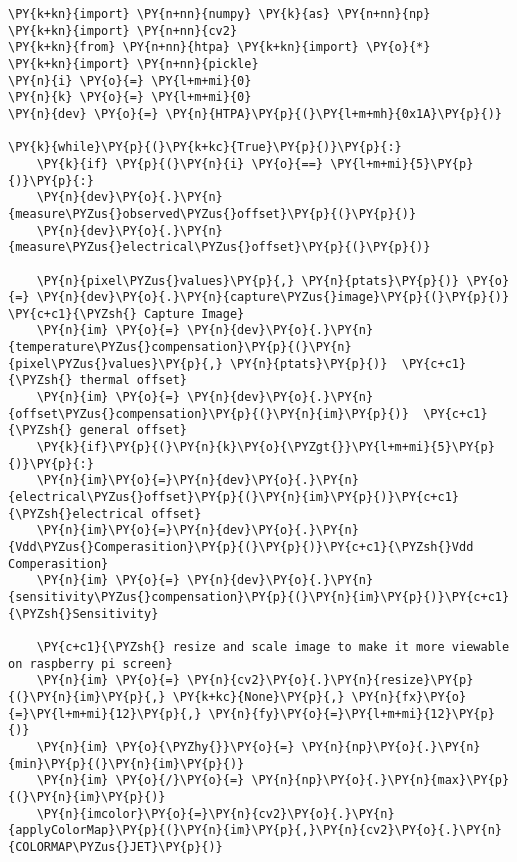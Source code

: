     \begin{tcolorbox}[breakable, size=fbox, boxrule=1pt, pad at break*=1mm,colback=cellbackground, colframe=cellborder]
\begin{Verbatim}[commandchars=\\\{\}]
\PY{k+kn}{import} \PY{n+nn}{numpy} \PY{k}{as} \PY{n+nn}{np}
\PY{k+kn}{import} \PY{n+nn}{cv2}
\PY{k+kn}{from} \PY{n+nn}{htpa} \PY{k+kn}{import} \PY{o}{*}
\PY{k+kn}{import} \PY{n+nn}{pickle}
\PY{n}{i} \PY{o}{=} \PY{l+m+mi}{0}
\PY{n}{k} \PY{o}{=} \PY{l+m+mi}{0}
\PY{n}{dev} \PY{o}{=} \PY{n}{HTPA}\PY{p}{(}\PY{l+m+mh}{0x1A}\PY{p}{)}

\PY{k}{while}\PY{p}{(}\PY{k+kc}{True}\PY{p}{)}\PY{p}{:}
    \PY{k}{if} \PY{p}{(}\PY{n}{i} \PY{o}{==} \PY{l+m+mi}{5}\PY{p}{)}\PY{p}{:}
    \PY{n}{dev}\PY{o}{.}\PY{n}{measure\PYZus{}observed\PYZus{}offset}\PY{p}{(}\PY{p}{)}
    \PY{n}{dev}\PY{o}{.}\PY{n}{measure\PYZus{}electrical\PYZus{}offset}\PY{p}{(}\PY{p}{)}

    \PY{n}{pixel\PYZus{}values}\PY{p}{,} \PY{n}{ptats}\PY{p}{)} \PY{o}{=} \PY{n}{dev}\PY{o}{.}\PY{n}{capture\PYZus{}image}\PY{p}{(}\PY{p}{)}  \PY{c+c1}{\PYZsh{} Capture Image}
    \PY{n}{im} \PY{o}{=} \PY{n}{dev}\PY{o}{.}\PY{n}{temperature\PYZus{}compensation}\PY{p}{(}\PY{n}{pixel\PYZus{}values}\PY{p}{,} \PY{n}{ptats}\PY{p}{)}  \PY{c+c1}{\PYZsh{} thermal offset}
    \PY{n}{im} \PY{o}{=} \PY{n}{dev}\PY{o}{.}\PY{n}{offset\PYZus{}compensation}\PY{p}{(}\PY{n}{im}\PY{p}{)}  \PY{c+c1}{\PYZsh{} general offset}
    \PY{k}{if}\PY{p}{(}\PY{n}{k}\PY{o}{\PYZgt{}}\PY{l+m+mi}{5}\PY{p}{)}\PY{p}{:}
    \PY{n}{im}\PY{o}{=}\PY{n}{dev}\PY{o}{.}\PY{n}{electrical\PYZus{}offset}\PY{p}{(}\PY{n}{im}\PY{p}{)}\PY{c+c1}{\PYZsh{}electrical offset}
    \PY{n}{im}\PY{o}{=}\PY{n}{dev}\PY{o}{.}\PY{n}{Vdd\PYZus{}Comperasition}\PY{p}{(}\PY{p}{)}\PY{c+c1}{\PYZsh{}Vdd Comperasition}
    \PY{n}{im} \PY{o}{=} \PY{n}{dev}\PY{o}{.}\PY{n}{sensitivity\PYZus{}compensation}\PY{p}{(}\PY{n}{im}\PY{p}{)}\PY{c+c1}{\PYZsh{}Sensitivity}

    \PY{c+c1}{\PYZsh{} resize and scale image to make it more viewable on raspberry pi screen}
    \PY{n}{im} \PY{o}{=} \PY{n}{cv2}\PY{o}{.}\PY{n}{resize}\PY{p}{(}\PY{n}{im}\PY{p}{,} \PY{k+kc}{None}\PY{p}{,} \PY{n}{fx}\PY{o}{=}\PY{l+m+mi}{12}\PY{p}{,} \PY{n}{fy}\PY{o}{=}\PY{l+m+mi}{12}\PY{p}{)}	
    \PY{n}{im} \PY{o}{\PYZhy{}}\PY{o}{=} \PY{n}{np}\PY{o}{.}\PY{n}{min}\PY{p}{(}\PY{n}{im}\PY{p}{)}
    \PY{n}{im} \PY{o}{/}\PY{o}{=} \PY{n}{np}\PY{o}{.}\PY{n}{max}\PY{p}{(}\PY{n}{im}\PY{p}{)}
    \PY{n}{imcolor}\PY{o}{=}\PY{n}{cv2}\PY{o}{.}\PY{n}{applyColorMap}\PY{p}{(}\PY{n}{im}\PY{p}{,}\PY{n}{cv2}\PY{o}{.}\PY{n}{COLORMAP\PYZus{}JET}\PY{p}{)}


\end{Verbatim}
\end{tcolorbox}
